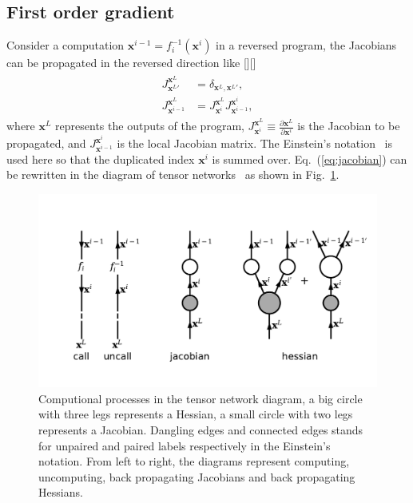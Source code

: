 \documentclass[aps,twocolumn,longbibliography,english,superscriptaddress]{revtex4-1}
\newcommand{\<}{\langle}
\renewcommand{\>}{\rangle}
\newcommand{\out}{{\vx^L}}
\newcommand{\vx}{{\mathbf{x}}}
\newcommand{\Eq}[1]{Eq.~(\ref{#1})}
\newcommand{\Fig}[1]{Fig.~\ref{#1}}
\newcommand{\blue}[1]{[{\bf  \color{blue}{JG: #1}}]}
\newcommand{\violet}[1]{[{\bf  \color{violet}{MLS: #1}}]}
\theoremstyle{definition}\newtheorem{definition}{\textit{Definition}}
\begin{document}
\subsection{First order gradient}\label{sec:jacobian}
Consider a computation $\vx^{i-1} = f_{i}^{-1}(\vx^{i})$ in a reversed program, the Jacobians can be propagated in the reversed direction like
\violet{adjoint mode AD does not propagate Jacobians.}\blue{now?}
\begin{align}
    \begin{split}
        J^{\out}_{\out'} &= \delta_{\out,\out'},\\
        J^{\out}_{\vx^{i-1}} &= J^{\out}_{\vx^i} J^{\vx^i}_{\vx^{i-1}},
    \end{split}\label{eq:jacobian}
\end{align}
where $\out$ represents the outputs of the program, $J^{\out}_{\vx^i} \equiv \frac{\partial \out}{\partial \vx^i}$ is the Jacobian to be propagated, and $J^{\vx^i}_{\vx^{i-1}}$ is the local Jacobian matrix. The Einstein's notation~\cite{Einsum} is used here so that the duplicated index $\vx^{i}$ is summed over.
\Eq{eq:jacobian} can be rewritten in the diagram of tensor networks~\cite{Orus2014} as shown in \Fig{fig:ad}.
\begin{figure}
    \centerline{\includegraphics[width=0.95\columnwidth,trim={0.5cm 1cm 0 1cm},clip]{images/ad.pdf}}
    \caption{Computional processes in the tensor network diagram, a big circle with three legs represents a Hessian, a small circle with two legs represents a Jacobian. Dangling edges and connected edges stands for unpaired and paired labels respectively in the Einstein's notation. From left to right, the diagrams represent computing, uncomputing, back propagating Jacobians and back propagating Hessians.}\label{fig:ad}
\end{figure}
\end{document}
